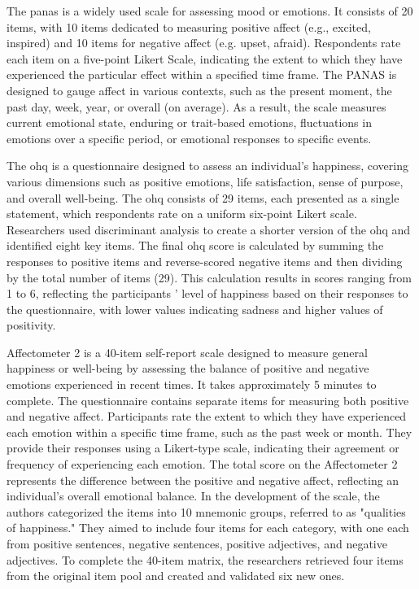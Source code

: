 \documentclass[a4paper,fleqn]{cas-sc}
\begin{document}
The \gls{panas} \cite{tran_positive_2013} is a widely used scale for assessing mood or emotions. It consists of 20 items, with 10 items dedicated to measuring positive affect (e.g., excited, inspired) and 10 items for negative affect (e.g. upset, afraid). Respondents rate each item on a five-point Likert Scale, indicating the extent to which they have experienced the particular effect within a specified time frame. The PANAS is designed to gauge affect in various contexts, such as the present moment, the past day, week, year, or overall (on average). As a result, the scale measures current emotional state, enduring or trait-based emotions, fluctuations in emotions over a specific period, or emotional responses to specific events.

The \gls{ohq} \cite{hills_oxford_2002} is a questionnaire designed to assess an individual's happiness, covering various dimensions such as positive emotions, life satisfaction, sense of purpose, and overall well-being. The \gls{ohq} consists of 29 items, each presented as a single statement, which respondents rate on a uniform six-point Likert scale. Researchers used discriminant analysis to create a shorter version of the \gls{ohq} and identified eight key items. The final \gls{ohq} score is calculated by summing the responses to positive items and reverse-scored negative items and then dividing by the total number of items (29). This calculation results in scores ranging from 1 to 6, reflecting the participants ' level of happiness based on their responses to the questionnaire, with lower values indicating sadness and higher values of positivity.

Affectometer 2 \cite{kammann_affectometer_1983} is a 40-item self-report scale designed to measure general happiness or well-being by assessing the balance of positive and negative emotions experienced in recent times. It takes approximately 5 minutes to complete. The questionnaire contains separate items for measuring both positive and negative affect. Participants rate the extent to which they have experienced each emotion within a specific time frame, such as the past week or month. They provide their responses using a Likert-type scale, indicating their agreement or frequency of experiencing each emotion. The total score on the Affectometer 2 represents the difference between the positive and negative affect, reflecting an individual's overall emotional balance. In the development of the scale, the authors categorized the items into 10 mnemonic groups, referred to as "qualities of happiness." They aimed to include four items for each category, with one each from positive sentences, negative sentences, positive adjectives, and negative adjectives. To complete the 40-item matrix, the researchers retrieved four items from the original item pool and created and validated six new ones.
\end{document}
